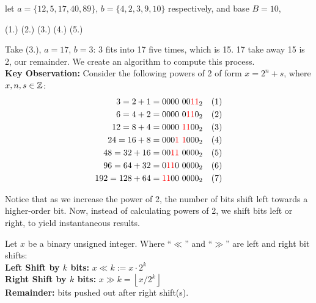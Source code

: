 \begin{Example}
let $a=\{12,5,17,40,89\}$, $b=\{4,2,3,9,10\}$ respectively, and base $B=10$,
\begin{center}
    (1.) (2.) (3.) (4.) (5.) 
\end{center}
\noindent
Take (3.), $a=17$, $b=3$: 3 fits into 17 five times, which is 15. 17 take away 15 is 2, our remainder. We 
create an algorithm to compute this process.\\

\noindent
\textbf{Key Observation:} Consider the following powers of 2 of form $x=2^n+s$, where $x,n,s\in\mathbb{Z}$:
\begin{align*}
    3 = 2 + 1 &= 0000 \ 00\textcolor{red}{11}_2 \quad (1) \\
    6 = 4 + 2 &= 0000 \ 0\textcolor{red}{11}0_2 \quad (2) \\
    12 = 8 + 4 &= 0000 \ \textcolor{red}{11}00_2 \quad (3) \\
    24 = 16 + 8 &= 000\textcolor{red}{1} \ \textcolor{red}{1}000_2 \quad (4) \\
    48 = 32 + 16 &= 00\textcolor{red}{11} \ 0000_2 \quad (5) \\
    96 = 64 + 32 &= 0\textcolor{red}{11}0 \ 0000_2 \quad (6) \\
    192 = 128 + 64 &= \textcolor{red}{11}00 \ 0000_2 \quad (7)
\end{align*}

\noindent
Notice that as we increase the power of 2, the number of bits shift left towards a higher-order bit. Now, instead of calculating powers of 
2, we shift bits left or right, to yield instantaneous results.
\end{Example}

\begin{theo}

    \label{theo:bit_shift}

    Let $x$ be a binary unsigned integer. Where ``$\ll$'' and ``$\gg$'' are left and right bit shifts:\\
    \noindent
    \textbf{Left Shift by $k$ bits:} $x \ll k:= x \cdot 2^k$\\
    \noindent
    \textbf{Right Shift by $k$ bits:} $x \gg k = \left\lfloor x/2^k \right\rfloor$\\
    \textbf{Remainder:} bits pushed out after right shift(s).
\end{theo}

